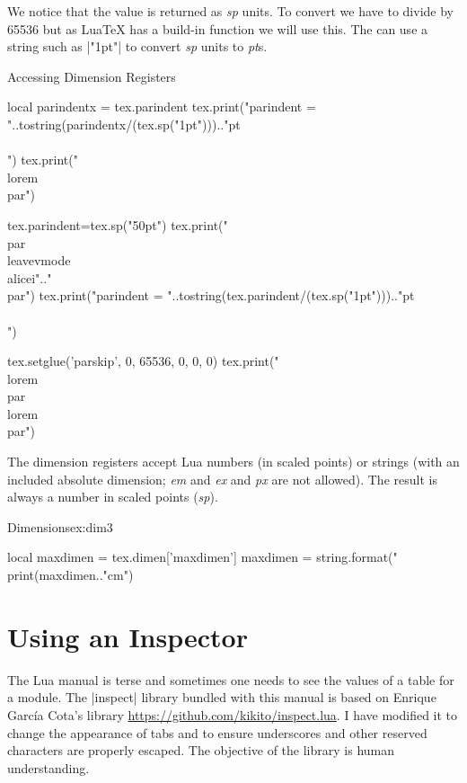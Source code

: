 We notice that the value is returned as \textit{sp} units. To convert we have to divide by 65536 but as LuaTeX has a build-in function  we will use this. The  can use a string such as |"1pt"| to convert \textit{sp} units to \textit{pt}s.

\begin{texexample}{Accessing Dimension Registers}{}
\parindent20pt
\begin{luacode}
local parindentx = tex.parindent
tex.print("parindent = "..tostring(parindentx/(tex.sp("1pt"))).."pt \\\\")  
tex.print("\\lorem\\par")  

tex.parindent=tex.sp("50pt")
tex.print("\\par\\leavevmode\\alicei".."\\par")
tex.print("parindent = "..tostring(tex.parindent/(tex.sp("1pt"))).."pt \\\\")
 
tex.setglue('parskip', 0, 65536, 0, 0, 0)
tex.print("\\lorem\\par\\lorem\\par")
\end{luacode}
\lorem
\lorem
\end{texexample}

The dimension registers accept Lua numbers (in scaled points) or strings (with an included
absolute dimension; \textit{em} and \textit{ex} and \textit{px} are not allowed). 
The result is always a number in scaled points (\textit{sp}).

\begin{texexample}{Dimensions}{ex:dim3}
\begin{luacode}
local maxdimen = tex.dimen['maxdimen']
maxdimen = string.format("%
print(maxdimen.."cm")
\end{luacode}
\end{texexample}


\section{Using an Inspector}

The Lua manual is terse and sometimes one needs to see the values of a table for a module. The |inspect| library bundled with this manual is based on Enrique García Cota's library \url{https://github.com/kikito/inspect.lua}. I have modified it to change the appearance of tabs and to ensure underscores and other reserved characters are properly escaped. The objective of the library is human understanding.

